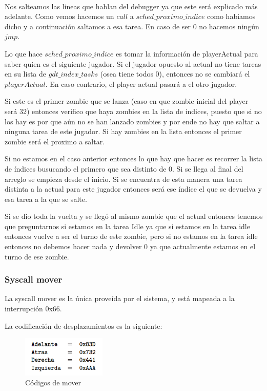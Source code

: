 \\
\par{Nos salteamos las lineas que hablan del debugger ya que este ser\'a explicado m\'as adelante. Como vemos hacemos un $call$ a $sched\_proximo\_indice$ como habiamos dicho y a continuaci\'on saltamos a esa tarea. En caso de ser 0 no hacemos ning\'un $jmp$.}
\par{Lo que hace $sched\_proximo\_indice$ es tomar la informaci\'on de playerActual para saber quien es el siguiente jugador. Si el jugador opuesto al actual no tiene tareas en su lista de $gdt\_index\_tasks$ (osea tiene todos 0), entonces no se cambiar\'a el $playerActual$. En caso contrario, el player actual pasar\'a a el otro jugador.}
\par{Si este es el primer zombie que se lanza (caso en que zombie inicial del player ser\'a 32) entonces verifico que haya zombies en la lista de indices, puesto que si no los hay es por que a\'un no se han lanzado zombies y por ende no hay que saltar a ninguna tarea de este jugador. Si hay zombies en la lista entonces el primer zombie ser\'a el proximo a saltar.}
\par{Si no estamos en el caso anterior entonces lo que hay que hacer es recorrer la lista de \'indices busucando el primero que sea distinto de 0. Si se llega al final del arreglo se empieza desde el inicio. Si se encuentra de esta manera una tarea distinta a la actual para este jugador entonces ser\'a ese \'indice el que se devuelva y esa tarea a la que se salte.}
\par{Si se dio toda la vuelta y se lleg\'o al mismo zombie que el actual entonces tenemos que preguntarnos si estamos en la tarea Idle ya que si estamos en la tarea idle entonces vuelve a ser el turno de este zombie, pero si no estamos en la tarea idle entonces no debemos hacer nada y devolver 0 ya que actualmente estamos en el turno de ese zombie.}



\newpage
\subsubsection*{Syscall mover}

\par La syscall mover es la \'unica prove\'ida por el sistema, y est\'a mapeada a la interrupci\'on 0x66.
\par La codificaci\'on de desplazamientos es la siguiente:

\begin{figure}[ht!]
\centering
\includegraphics[width=40mm]{imagenes/movercodes.png}
\caption{C\'odigos de mover}
\end{figure}

